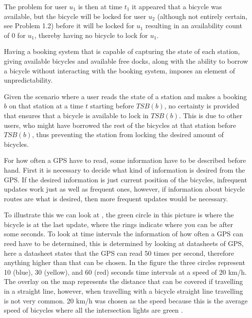\begin{description}[style=nextline]
The problem for user $u_1$ is then at time $t_1$ it appeared that a bicycle was available, but the bicycle will be locked for user $u_2$ (although not entirely certain, see Problem 1.2) before it will be locked for $u_1$ resulting in an availability count of 0 for $u_1$, thereby having no bicycle to lock for $u_1$.

\item[Problem 1.2] Having a booking system that is capable of capturing the state of each station, giving available bicycles and available free docks, along with the ability to borrow a bicycle without interacting with the booking system, imposes an element of unpredictability.

Given the scenario where a user reads the state of a station and makes a booking $b$ on that station at a time $t$ starting before $TSB(b)$, no certainty is provided that ensures that a bicycle is available to lock in $TSB(b)$. 
This is due to other users, who might have borrowed the rest of the bicycles at that station before $TSB(b)$, thus preventing the station from locking the desired amount of bicycles.

\item[Problem 1.3]
For how often a GPS have to read, some information have to be described before hand.
First it is necessary to decide what kind of information is desired from the GPS.
If the desired information is just current position of the bicycles, infrequent updates work just as well as frequent ones, however, if information about bicycle routes are what is desired, then more frequent updates would be necessary.

To illustrate this we can look at , the green circle in this picture is where the bicycle is at the last update, where the rings indicate where you can be after some seconds.
To look at time intervals the information of how often a GPS can reed have to be determined, this is determined by looking at datasheets of GPS, here a datasheet \citep{manual:gpsDataSheet} states that the GPS can read 50 times per second, therefore anything higher than that can be chosen.
In the figure the three circles represent 10 (blue), 30  (yellow), and 60 (red) seconds time intervals at a speed of 20 km/h.
The overlay on the map represents the distance that can be covered if travelling in a straight line, however, when travelling with a bicycle straight line travelling is not very common.
20 km/h was chosen as the speed because this is the average speed of bicycles where all the intersection lights are green \citep{misc:bicycleStatistics}.


\end{description}
